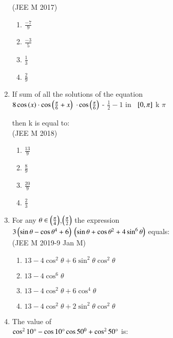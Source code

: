 \documentclass[journal,10pt,twocolumn]{IEEEtran}
\theoremstyle{remark}
\begin{document}
\begin{enumerate}[start=14]
\hfill{(JEE M 2017)}\\
    \begin{enumerate}
    \item $\frac{-7}{9}$ 
    \item $\frac{-3}{5}$
    \item $\frac{1}{3}$
    \item $\frac{2}{9}$\\
    \end{enumerate}
 \item If sum of all the solutions of the equation\\
  $8 \cos\left(x\right) \cdot \cos\left(\frac{\pi}{6} + x \right)$ $\cdot \cos \left(\frac{\pi}{6}\right)$ - $\frac{1}{2} - 1 \text{ in }$ ${}\left[0, \pi\right]$ k $\pi$

 then k is equal to:\\
 
\hfill{(JEE M 2018)}\\
\begin{enumerate}
\item $\frac{13}{9}$
\item $\frac{8}{9}$\\
\item  $\frac{20}{9}$
\item  $\frac{2}{3}$\\
\end{enumerate}
  \item For any $\theta \in \left(\frac{\pi}{4}\right)$,$\left(\frac{\pi}{2}\right)$ the expression\\
 $3\left(\sin\theta-\cos\theta^4 +6\right)$ $\left(\sin\theta+\cos\theta^2 +4\sin^{6}\theta\right)$ equals:\\
 
\hfill {(JEE M 2019-9 Jan  M)}\\
 \begin{enumerate}
 \item $13-4\cos^2\theta +6\sin^2\theta \cos^2\theta $\\
 \item  $13-4\cos^6\theta$\\
\item  $13-4\cos^2\theta +6\cos^4\theta$\\
 \item $13-4\cos^2\theta +2\sin^2\theta \cos^2\theta$\\
 \end{enumerate}
\item The value of\\ $\cos^210\degree-\cos10\degree\cos50^{0}+\cos^250\degree$ is:\\


\end{enumerate}
\end{document}
